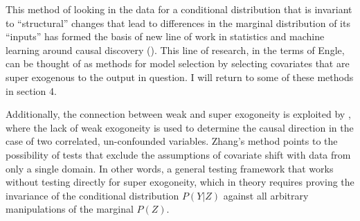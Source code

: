 \documentclass[a4paper,12pt]{article}
\begin{document}
This method of looking in the data for a conditional distribution that is invariant to ``structural'' changes that lead to differences in the marginal distribution of its ``inputs'' has formed the basis of new line of work in statistics and machine learning around causal discovery (\cite{Peters2015, Heinze-deml2017, Rojas-carulla2018}). This line of research, in the terms of Engle, can be thought of as methods for model selection by selecting covariates that are super exogenous to the output in question. I will return to some of these methods in section 4.

Additionally, the connection between weak and super exogoneity is exploited by \cite{Zhang2015}, where the lack of weak exogoneity is used to determine the causal direction in the case of two correlated, un-confounded variables. Zhang's method points to the possibility of tests that exclude the assumptions of covariate shift with data from only a single domain. In other words, a general testing framework that works without testing directly for super exogoneity, which in theory requires proving the invariance of the conditional distribution $P(Y|Z)$ against all arbitrary manipulations of the marginal $P(Z)$. 




\end{document}
